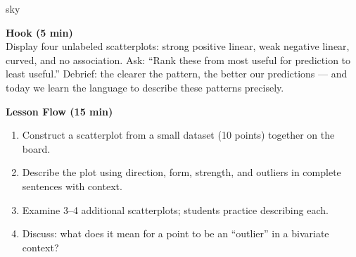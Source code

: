 \documentclass[10pt]{article}
\begin{document}
\begin{skillbox}{sky}
\begin{minipage}[t]{0.48\linewidth}
    \textbf{Hook (5 min)}\\
    Display four unlabeled scatterplots: strong positive linear, weak negative linear, curved, and
    no association. Ask: ``Rank these from most useful for prediction to least useful.'' Debrief:
    the clearer the pattern, the better our predictions --- and today we learn the language to
    describe these patterns precisely.
\end{minipage}
\hfill
\begin{minipage}[t]{0.48\linewidth}
    \textbf{Lesson Flow (15 min)}
    \begin{enumerate}
        \item Construct a scatterplot from a small dataset (10 points) together on the board.
        \item Describe the plot using direction, form, strength, and outliers in complete sentences with context.
        \item Examine 3--4 additional scatterplots; students practice describing each.
        \item Discuss: what does it mean for a point to be an ``outlier'' in a bivariate context?
    \end{enumerate}
\end{minipage}
\end{skillbox}
\end{document}
